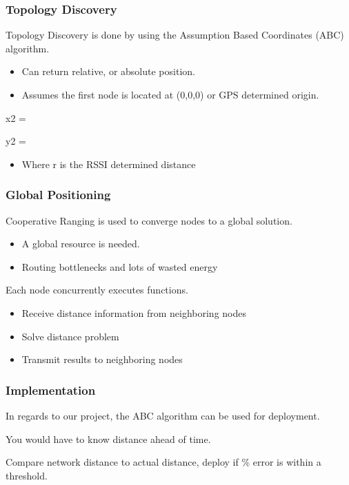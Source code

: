 \begin{frame}[t]
  \frametitle{Topology Discovery}

  Topology Discovery is done by using the Assumption Based Coordinates (ABC)
  algorithm.

  \begin{itemize}
  \item Can return relative, or absolute position.
  \item Assumes the first node is located at (0,0,0) or GPS determined origin.
  \end{itemize}
  
  \begin{center}
    x2 = 
  \end{center} \linebreak
  \begin{center}
    y2 = 
  \end{center}

  \vfill
  
  \begin{itemize}
  \item Where r is the RSSI determined distance
  \end{itemize}

  \vfill
\end {frame}

\begin{frame}[t]
  \frametitle{Global Positioning}

  Cooperative Ranging is used to converge nodes to a global solution.
  \begin{itemize}
  \item A global resource is needed.
  \item Routing bottlenecks and lots of wasted energy
  \end{itemize}

  Each node concurrently executes functions.
  \begin{itemize}
  \item Receive distance information from neighboring nodes
  \item Solve distance problem
  \item Transmit results to neighboring nodes
  \end{itemize}
\end{frame}

\begin{frame}[t]
  \frametitle{Implementation}

  In regards to our project, the ABC algorithm can be used for deployment.
  
  You would have to know distance ahead of time.
  
  Compare network distance to actual distance, deploy if \% error is within a
  threshold.

  \vfill

\end {frame}

  

  
  
    
